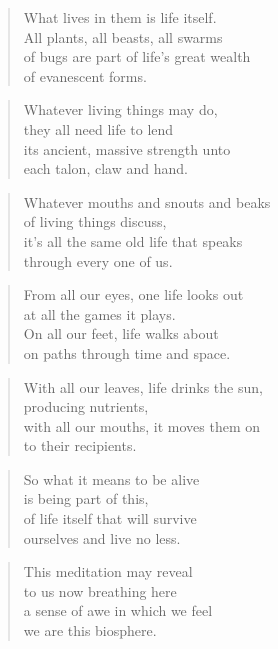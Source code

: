 \documentclass[14pt,a4paper]{article}
\begin{document}
\begin{verse}
What lives in them is life itself.\\
All plants, all beasts, all swarms\\
of bugs are part of life’s great wealth\\
of evanescent forms.
\end{verse}

\begin{verse}
Whatever living things may do,\\
they all need life to lend\\
its ancient, massive strength unto\\
each talon, claw and hand.
\end{verse}

\begin{verse}
Whatever mouths and snouts and beaks\\
of living things discuss,\\
it’s all the same old life that speaks\\
through every one of us.
\end{verse}

\begin{verse}
From all our eyes, one life looks out\\
at all the games it plays.\\
On all our feet, life walks about\\
on paths through time and space.
\end{verse}

\begin{verse}
With all our leaves, life drinks the sun,\\
producing nutrients,\\
with all our mouths, it moves them on\\
to their recipients.
\end{verse}

\begin{verse}
So what it means to be alive\\
is being part of this,\\
of life itself that will survive\\
ourselves and live no less.
\end{verse}

\begin{verse}
This meditation may reveal\\
to us now breathing here\\
a sense of awe in which we feel\\
we are this biosphere.
\end{verse}
\end{document}
